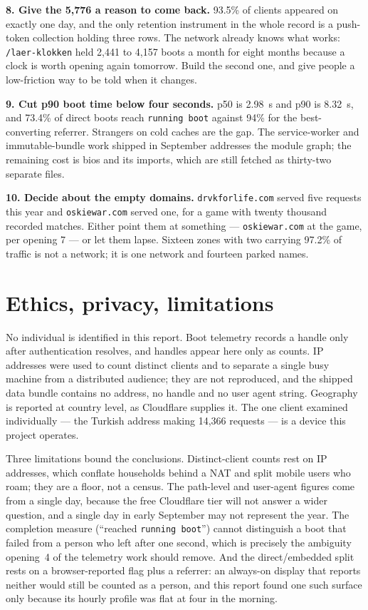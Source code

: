 \documentclass[10pt,letterpaper,twocolumn]{article}
\begin{document}
\textbf{8. Give the 5,776 a reason to come back.} 93.5\% of clients
appeared on exactly one day, and the only retention instrument in the
whole record is a push-token collection holding three rows. The
network already knows what works: \texttt{/laer-klokken} held 2,441 to
4,157 boots a month for eight months because a clock is worth opening
again tomorrow. Build the second one, and give people a low-friction
way to be told when it changes.

\textbf{9. Cut p90 boot time below four seconds.} p50 is 2.98~s and
p90 is 8.32~s, and 73.4\% of direct boots reach \texttt{running boot}
against 94\% for the best-converting referrer. Strangers on cold caches
are the gap. The service-worker and immutable-bundle work shipped in
September addresses the module graph; the remaining cost is bios and
its imports, which are still fetched as thirty-two separate files.

\textbf{10. Decide about the empty domains.} \texttt{drvkforlife.com}
served five requests this year and \texttt{oskiewar.com} served one,
for a game with twenty thousand recorded matches. Either point them at
something --- \texttt{oskiewar.com} at the game, per opening 7 --- or let
them lapse. Sixteen zones with two carrying 97.2\% of traffic is not a
network; it is one network and fourteen parked names.

\section{Ethics, privacy, limitations}

No individual is identified in this report. Boot telemetry records a
handle only after authentication resolves, and handles appear here only
as counts. IP addresses were used to count distinct clients and to
separate a single busy machine from a distributed audience; they are
not reproduced, and the shipped data bundle contains no address, no
handle and no user agent string. Geography is reported at country
level, as Cloudflare supplies it. The one client examined
individually --- the Turkish address making 14,366 requests --- is a device
this project operates.

Three limitations bound the conclusions. Distinct-client counts rest on
IP addresses, which conflate households behind a NAT and split mobile
users who roam; they are a floor, not a census. The path-level and
user-agent figures come from a single day, because the free Cloudflare
tier will not answer a wider question, and a single day in early
September may not represent the year. The completion measure (``reached \texttt{running boot}'') cannot
distinguish a boot that failed from a person who left after one second,
which is precisely the ambiguity opening~4 of the telemetry work should
remove. And the direct/embedded split rests on a browser-reported flag
plus a referrer: an always-on display that reports neither would still
be counted as a person, and this report found one such surface only
because its hourly profile was flat at four in the morning.
\end{document}

